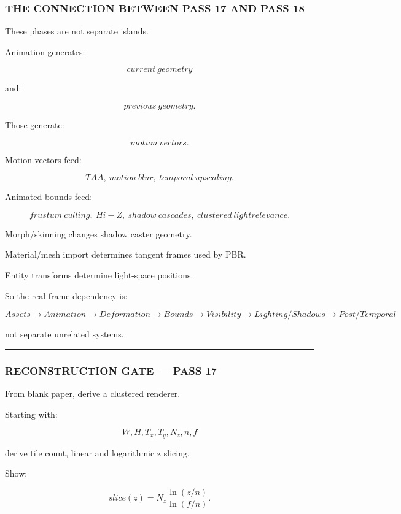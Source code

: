 \subsubsection{THE CONNECTION BETWEEN PASS 17 AND PASS 18}\label{the-connection-between-pass-17-and-pass-18}

These phases are not separate islands.

Animation generates:

\[
current\ geometry
\]

and:

\[
previous\ geometry.
\]

Those generate:

\[
motion\ vectors.
\]

Motion vectors feed:

\[
TAA,\ motion\ blur,\ temporal\ upscaling.
\]

Animated bounds feed:

\[
frustum\ culling,\ Hi-Z,\ shadow\ cascades,\ clustered\ light relevance.
\]

Morph/skinning changes shadow caster geometry.

Material/mesh import determines tangent frames used by PBR.

Entity transforms determine light-space positions.

So the real frame dependency is:

\[
\boxed{
Assets
\rightarrow
Animation
\rightarrow
Deformation
\rightarrow
Bounds
\rightarrow
Visibility
\rightarrow
Lighting/Shadows
\rightarrow
Post/Temporal
}
\]

not separate unrelated systems.

\begin{center}\rule{0.5\linewidth}{0.5pt}\end{center}

\subsubsection{RECONSTRUCTION GATE --- PASS 17}\label{reconstruction-gate-pass-17}

From blank paper, derive a clustered renderer.

Starting with:

\[
W,H,T_x,T_y,N_z,n,f
\]

derive tile count, linear and logarithmic z slicing.

Show:

\[
slice(z)
=
N_z
\frac{
\ln(z/n)
}{
\ln(f/n)
}.
\]

